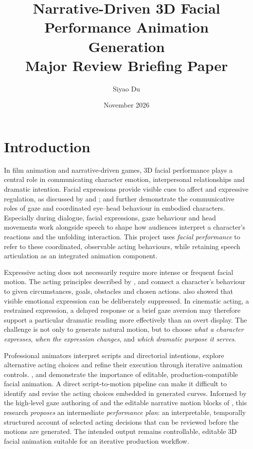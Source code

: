 \documentclass[11pt,a4paper]{article}
\title{Narrative-Driven 3D Facial Performance Animation Generation\\\large Major Review Briefing Paper}
\author{Siyao Du}
\date{November 2026}
\begin{document}
\maketitle

\section{Introduction}

In film animation and narrative-driven games, 3D facial performance plays a central role in communicating character emotion, interpersonal relationships and dramatic intention. Facial expressions provide visible cues to affect and expressive regulation, as discussed by \citet{ekman2002facs} and \citet{gross1998regulation}; \citet{garau2001impact} and \citet{ruhland2015review} further demonstrate the communicative roles of gaze and coordinated eye--head behaviour in embodied characters. Especially during dialogue, facial expressions, gaze behaviour and head movements work alongside speech to shape how audiences interpret a character's reactions and the unfolding interaction. This project uses \emph{facial performance} to refer to these coordinated, observable acting behaviours, while retaining speech articulation as an integrated animation component.

Expressive acting does not necessarily require more intense or frequent facial motion. The acting principles described by \citet{stanislavski1936actor}, \citet{weston1996directing} and \citet{hooks2023acting} connect a character's behaviour to given circumstances, goals, obstacles and chosen actions. \citet{gross1998regulation} also showed that visible emotional expression can be deliberately suppressed. In cinematic acting, a restrained expression, a delayed response or a brief gaze aversion may therefore support a particular dramatic reading more effectively than an overt display. The challenge is not only to generate natural motion, but to choose \emph{what a character expresses}, \emph{when the expression changes}, and \emph{which dramatic purpose it serves}.

Professional animators interpret scripts and directorial intentions, explore alternative acting choices and refine their execution through iterative animation controls. \citet{edwards2016jali}, \citet{choi2022animatomy} and \citet{busacchi2026unreal} demonstrate the importance of editable, production-compatible facial animation. A direct script-to-motion pipeline can make it difficult to identify and revise the acting choices embedded in generated curves. Informed by the high-level gaze authoring of \citet{pejsa2016authoring} and the editable narrative motion blocks of \citet{bourgault2025narrative}, this research \emph{proposes} an intermediate \emph{performance plan}: an interpretable, temporally structured account of selected acting decisions that can be reviewed before the motions are generated. The intended output remains controllable, editable 3D facial animation suitable for an iterative production workflow.
\end{document}

